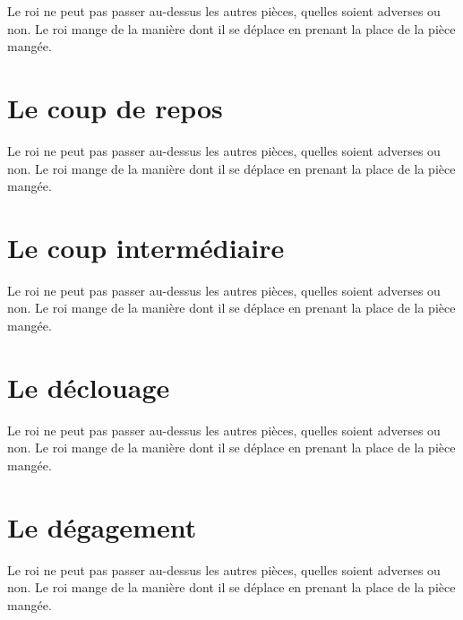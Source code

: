 \documentclass[a5paper,openany,twocolumn]{book}%
\begin{document}
Le roi ne peut pas passer au-dessus les autres pièces, quelles soient adverses ou non. Le roi mange de la manière dont il se déplace en prenant la place de la pièce mangée. 


\chapter{Le coup de repos}

Le roi ne peut pas passer au-dessus les autres pièces, quelles soient adverses ou non. Le roi mange de la manière dont il se déplace en prenant la place de la pièce mangée. 


\chapter{Le coup intermédiaire}

Le roi ne peut pas passer au-dessus les autres pièces, quelles soient adverses ou non. Le roi mange de la manière dont il se déplace en prenant la place de la pièce mangée. 


\chapter{Le déclouage}

Le roi ne peut pas passer au-dessus les autres pièces, quelles soient adverses ou non. Le roi mange de la manière dont il se déplace en prenant la place de la pièce mangée. 


\chapter{Le dégagement}

Le roi ne peut pas passer au-dessus les autres pièces, quelles soient adverses ou non. Le roi mange de la manière dont il se déplace en prenant la place de la pièce mangée. 
\end{document}
